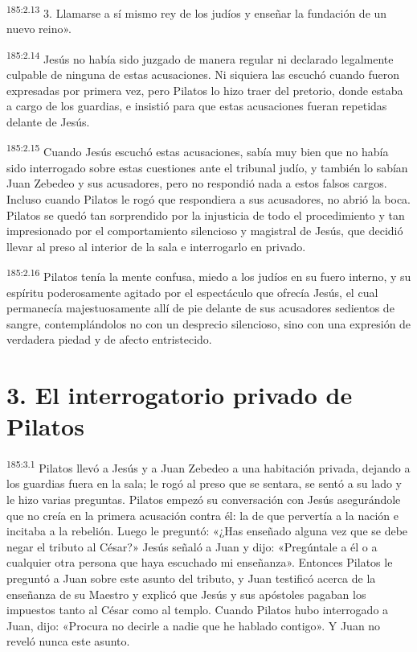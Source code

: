 \par 
\textsuperscript{185:2.13} 3. Llamarse a sí mismo rey de los judíos y enseñar la fundación de un nuevo reino».

\par 
\textsuperscript{185:2.14} Jesús no había sido juzgado de manera regular ni declarado legalmente culpable de ninguna de estas acusaciones. Ni siquiera las escuchó cuando fueron expresadas por primera vez, pero Pilatos lo hizo traer del pretorio, donde estaba a cargo de los guardias, e insistió para que estas acusaciones fueran repetidas delante de Jesús.

\par 
\textsuperscript{185:2.15} Cuando Jesús escuchó estas acusaciones, sabía muy bien que no había sido interrogado sobre estas cuestiones ante el tribunal judío, y también lo sabían Juan Zebedeo y sus acusadores, pero no respondió nada a estos falsos cargos. Incluso cuando Pilatos le rogó que respondiera a sus acusadores, no abrió la boca. Pilatos se quedó tan sorprendido por la injusticia de todo el procedimiento y tan impresionado por el comportamiento silencioso y magistral de Jesús, que decidió llevar al preso al interior de la sala e interrogarlo en privado.

\par 
\textsuperscript{185:2.16} Pilatos tenía la mente confusa, miedo a los judíos en su fuero interno, y su espíritu poderosamente agitado por el espectáculo que ofrecía Jesús, el cual permanecía majestuosamente allí de pie delante de sus acusadores sedientos de sangre, contemplándolos no con un desprecio silencioso, sino con una expresión de verdadera piedad y de afecto entristecido.

\section*{3. El interrogatorio privado de Pilatos}
\par 
\textsuperscript{185:3.1} Pilatos llevó a Jesús y a Juan Zebedeo a una habitación privada, dejando a los guardias fuera en la sala; le rogó al preso que se sentara, se sentó a su lado y le hizo varias preguntas. Pilatos empezó su conversación con Jesús asegurándole que no creía en la primera acusación contra él: la de que pervertía a la nación e incitaba a la rebelión. Luego le preguntó: «¿Has enseñado alguna vez que se debe negar el tributo al César?» Jesús señaló a Juan y dijo: «Pregúntale a él o a cualquier otra persona que haya escuchado mi enseñanza». Entonces Pilatos le preguntó a Juan sobre este asunto del tributo, y Juan testificó acerca de la enseñanza de su Maestro y explicó que Jesús y sus apóstoles pagaban los impuestos tanto al César como al templo. Cuando Pilatos hubo interrogado a Juan, dijo: «Procura no decirle a nadie que he hablado contigo». Y Juan no reveló nunca este asunto.

